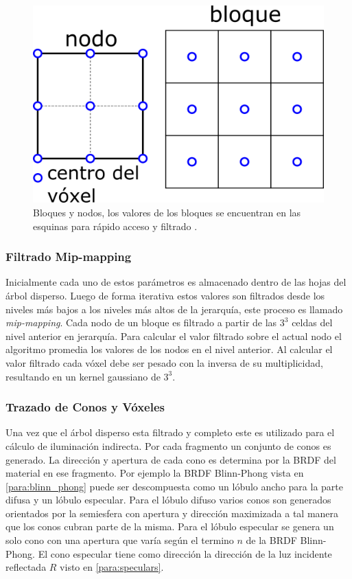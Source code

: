 \begin{figure}[H]
	\centering
	\includegraphics[width=0.3\linewidth]{media/bricks_vct.png}
	\caption{Bloques y nodos, los valores de los bloques se encuentran en las esquinas para rápido acceso y filtrado \cite{CNSGE11b}.}
	\label{fig:bricks_vct}
\end{figure}

\subsubsection{Filtrado Mip-mapping}
Inicialmente cada uno de estos parámetros es almacenado dentro de las hojas del árbol disperso. Luego de forma iterativa estos valores son filtrados desde los niveles más bajos a los niveles más altos de la jerarquía, este proceso es llamado \emph{mip-mapping}. Cada nodo de un bloque es filtrado a partir de las $3^3$ celdas del nivel anterior en jerarquía. Para calcular el valor filtrado sobre el actual nodo el algoritmo promedia los valores de los nodos en el nivel anterior. Al calcular el valor filtrado cada vóxel debe ser pesado con la inversa de su multiplicidad, resultando en un kernel gaussiano de $3^3$.  
\subsubsection{Trazado de Conos y Vóxeles}
Una vez que el árbol disperso esta filtrado y completo este es utilizado para el cálculo de iluminación indirecta. Por cada fragmento un conjunto de conos es generado. La dirección y apertura de cada cono es determina por la \ac{BRDF} del material en ese fragmento. Por ejemplo la \ac{BRDF} Blinn-Phong vista en \ref{para:blinn_phong} puede ser descompuesta como un lóbulo ancho para la parte difusa y un lóbulo especular. Para el lóbulo difuso varios conos son generados orientados por la semiesfera con apertura y dirección maximizada a tal manera que los conos cubran parte de la misma. Para el lóbulo especular se genera un solo cono con una apertura que varía según el termino $n$ de la \ac{BRDF} Blinn-Phong. El cono especular tiene como dirección la dirección de la luz incidente reflectada $R$ visto en \ref{para:speculars}.


